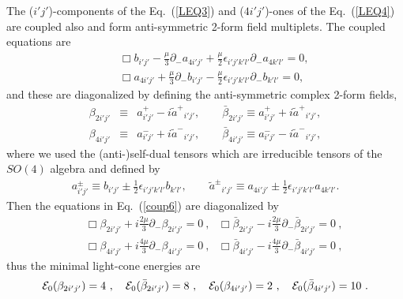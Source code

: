 \documentclass[a4paper,12pt]{article}
\numberwithin{equation}{section}
\begin{document}
The ($i'j'$)-components of the Eq.~(\ref{LEQ3}) and ($4i'j'$)-ones of
the Eq.~(\ref{LEQ4}) are coupled also and form anti-symmetric 2-form
field multiplets. The coupled equations are
\begin{eqnarray}
&& \Box b_{i'j'} - \frac{\mu}3 \partial_- a_{4i'j'}
                + \frac{\mu}2 \epsilon_{i'j'k'l'}
                  \partial_- a_{4k'l'} = 0,
\nonumber \\
&&\Box a_{4i'j'} + \frac{\mu}3 \partial_- b_{i'j'}
                 - \frac{\mu}2 \epsilon_{i'j'k'l'}
                   \partial_- b_{k'l'} = 0,
\label{coup6}
\end{eqnarray}
and these are diagonalized by defining the anti-symmetric complex
2-form fields,
\begin{eqnarray}
\beta_{2i'j'} &\equiv& a^+_{i'j'} - i {\tilde a^+}_{i'j'}, \qquad
\bar\beta_{2i'j'} \equiv a^+_{i'j'} + i {\tilde a^+}_{i'j'},
\nonumber \\
\beta_{4i'j'} &\equiv& a^-_{i'j'} + i {\tilde a^-}_{i'j'}, \qquad
\bar\beta_{4i'j'} \equiv a^-_{i'j'} - i {\tilde a^-}_{i'j'},
\label{mod6}
\end{eqnarray}
where we used the (anti-)self-dual tensors which are irreducible
tensors of the $SO(4)$ algebra and defined by
\begin{eqnarray}
a^{\pm}_{i'j'} \equiv b_{i'j'}
                           \pm \frac12\epsilon_{i'j'k'l'}
                            b_{k'l'},
\qquad {\tilde a^{\pm}}_{i'j'} \equiv  a_{4i'j'}
                                \pm \frac12\epsilon_{i'j'k'l'}
                                a_{4k'l'}.
\nonumber
\end{eqnarray}
Then the equations in Eq.~(\ref{coup6}) are diagonalized by
\begin{eqnarray}
&&\Box \beta_{2i'j'}
    + i \frac{2\mu}{3} \partial_- \beta_{2i'j'} = 0 ~,~~~
  \Box \bar\beta_{2i'j'}
    - i \frac{2\mu}{3} \partial_- \bar\beta_{2i'j'} = 0 ~,
\nonumber  \\
&&\Box \beta_{4i'j'}
    + i \frac{4\mu}{3} \partial_- \beta_{4i'j'} = 0 ~,~~~
  \Box \bar\beta_{4i'j'}
    - i \frac{4\mu}{3} \partial_- \bar\beta_{4i'j'} = 0 ~,
\label{dia6}
\end{eqnarray}
thus the minimal light-cone energies are
\begin{equation}\label{eng6}
{\cal E}_0(\beta_{2i'j'}) = 4 ~,~~~
{\cal E}_0(\bar\beta_{2i'j'}) = 8 ~,~~~
{\cal E}_0(\beta_{4i'j'}) = 2 ~,~~~
{\cal E}_0(\bar\beta_{4i'j'}) = 10 ~.
\end{equation}
\end{document}

